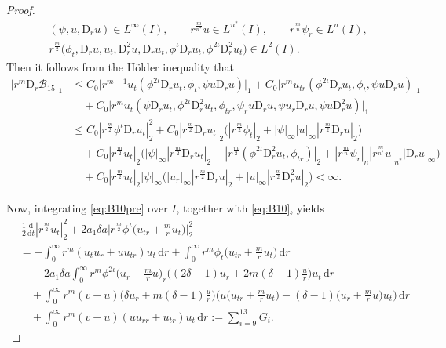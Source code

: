 \documentclass[11pt,reqno]{amsart}
\numberwithin{rk}{section}
\numberwithin{prop}{section}
\numberwithin{mydef}{section}
\numberwithin{lem}{section}
\numberwithin{equation}{section}
\numberwithin{thm}{section}
\begin{document}
\begin{proof}
\begin{equation*}
\begin{aligned}
&(\psi,u,\mathrm{D}_r u)\in L^\infty(I),\qquad r^\frac{m}{n^*}u\in L^{n^*}(I) ,\qquad r^\frac{m}{n}\psi_r\in L^{n}(I),\\
&r^\frac{m}{2}\big(\phi_t,\mathrm{D}_r u,u_t,\mathrm{D}_r^2 u,\mathrm{D}_r u_t,\phi^\iota \mathrm{D}_r u_t,\phi^{2\iota}\mathrm{D}_r^2 u_t\big)\in L^2(I).    
\end{aligned}
\end{equation*}
Then it follows from the H\"older inequality that
\begin{equation*} 
\begin{aligned}
|r^m \mathrm{D}_r \mathcal{B}_{15}|_1&\leq C_0\big|r^{m-1} u_t (\phi^{2\iota}\mathrm{D}_r u_t,\phi_t,\psi u\mathrm{D}_r u)\big|_1 +C_0\big|r^{m}u_{tr} (\phi^{2\iota}\mathrm{D}_r u_t,\phi_t,\psi u\mathrm{D}_r u)\big|_1\\
&\quad +C_0 \big|r^{m}u_{t} (\psi\mathrm{D}_r u_t,\phi^{2\iota}\mathrm{D}_r^2 u_t,\phi_{tr},\psi_r u \mathrm{D}_r u,\psi u_r \mathrm{D}_r u,\psi u \mathrm{D}_r^2 u)\big|_1\\
&\leq C_0 |r^\frac{m}{2}\phi^\iota\mathrm{D}_r u_t|_2^2+C_0 |r^\frac{m}{2} \mathrm{D}_r u_t|_2\big( |r^\frac{m}{2} \phi_t|_2+|\psi|_\infty |u|_\infty|r^\frac{m}{2}\mathrm{D}_r u|_2\big)\\
&\quad +C_0|r^\frac{m}{2}u_t|_2\big(|\psi|_\infty|r^\frac{m}{2}\mathrm{D}_r u_t|_2+|r^\frac{m}{2}(\phi^{2\iota}\mathrm{D}_r^2 u_t,\phi_{tr})|_2+|r^\frac{m}{n}\psi_r|_n|r^\frac{m}{n^*}u|_{n^*} |\mathrm{D}_r u|_\infty\big)\\
&\quad +C_0|r^\frac{m}{2}u_t|_2|\psi|_\infty\big(|u_r|_\infty |r^\frac{m}{2}\mathrm{D}_r u|_2+ |u|_\infty |r^\frac{m}{2}\mathrm{D}_r^2 u|_2\big)<\infty.
\end{aligned}    
\end{equation*}


Now, integrating \eqref{eq:B10pre} over $I$, together with \eqref{eq:B10}, yields
\begin{equation}\label{util2}
\begin{aligned}
&\,\frac{1}{2} \frac{\mathrm{d}}{\mathrm{d}t}|r^{\frac{m}{2}}u_t|^2_2+2a_1\delta a \Big|r^{\frac{m}{2}}\phi^\iota\big(u_{tr}+\frac{m}{r}u_t\big)\Big|_2^2\\
&=-\int_0^\infty r^m(u_tu_{r}+uu_{tr}) u_t\,\mathrm{d}r+\int_0^\infty r^m \phi_t\big(u_{tr}+\frac{m}{r}u_t\big)\,\mathrm{d}r\\
&\quad -2a_1 \delta a\int_0^\infty  r^m\phi^{2\iota}\big(u_r+\frac{m}{r}u\big)_r\big((2\delta-1) u_r +2m(\delta-1)\frac{u}{r}\big)u_t\,\mathrm{d}r\\
&\quad +\int_0^\infty r^m(v-u)\big(\delta u_r+m(\delta-1)\frac{u}{r}\big)\Big(u\big(u_{tr}+\frac{m}{r}u_t\big)-(\delta-1)\big(u_r+\frac{m}{r}u\big) u_t\Big)\,\mathrm{d}r\\
&\quad + \int_0^\infty r^m(v-u)(uu_{rr}+u_{tr})u_t\,\mathrm{d}r:=\sum_{i=9}^{13} G_i.
\end{aligned}    
\end{equation}



\end{proof}
\end{document}
